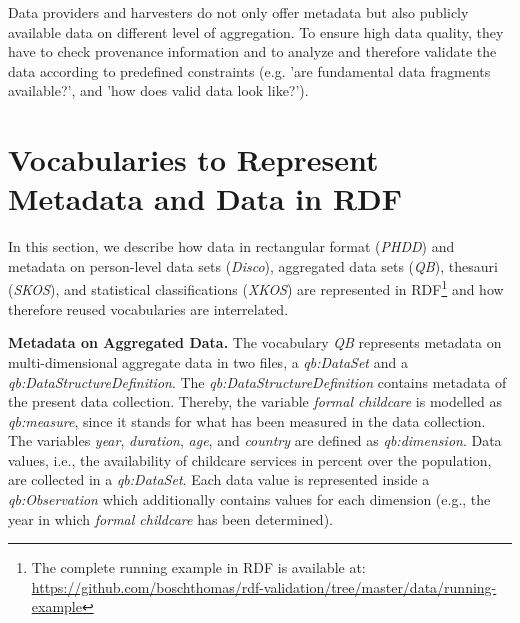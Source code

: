 \documentclass{llncs}
\newcommand{\tb}[1]{\todo[size=\small, color=green!40]{\textbf{Thomas:} #1}}
\begin{document}
Data providers and harvesters do not only offer metadata but also publicly available data on different level of aggregation.
To ensure high data quality, they have to check provenance information and to analyze and therefore validate the data according to predefined constraints (e.g. 'are fundamental data fragments available?', and 'how does valid data look like?'). 

\section{Vocabularies to Represent Metadata and Data in RDF}
\label{rdf-representation}

In this section, we describe how data in rectangular format (\emph{PHDD}) and metadata on person-level data sets (\emph{Disco}), aggregated data sets (\emph{QB}), thesauri (\emph{SKOS}), and statistical classifications (\emph{XKOS}) are represented in RDF\footnote{The complete running example in RDF is available at: \url{https://github.com/boschthomas/rdf-validation/tree/master/data/running-example}} and how therefore reused vocabularies are interrelated.
\tb{reihenfolge / DCAT fehlt}

\textbf{Metadata on Aggregated Data.}
The vocabulary \emph{QB} represents metadata on multi-dimensional aggregate data in two files, a \emph{qb:DataSet} and a \emph{qb:DataStructureDefinition}.
The \emph{qb:DataStructureDefinition} contains metadata of the present data collection.
Thereby, the variable \emph{formal childcare} is modelled as \emph{qb:measure}, since it stands for what has been measured in the data collection.
The variables \emph{year}, \emph{duration}, \emph{age}, and \emph{country} are defined as \emph{qb:dimension}.
Data values, i.e., the availability of childcare services in percent over the population, are collected in a \emph{qb:DataSet}. 
Each data value is represented inside a \emph{qb:Observation} which additionally contains values for each dimension 
(e.g., the year in which \emph{formal childcare} has been determined).
\end{document}
